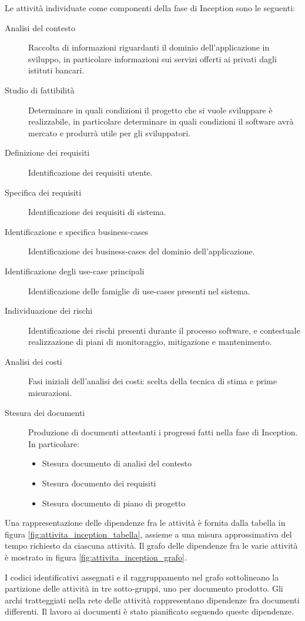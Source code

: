 Le attivit\`a individuate come componenti della fase di Inception sono le seguenti:
\begin{description}
	\item[Analisi del contesto]
		Raccolta di informazioni riguardanti il dominio dell'applicazione in sviluppo, in particolare informazioni sui servizi offerti ai privati dagli istituti bancari.
	\item[Studio di fattibilit\`a]
		Determinare in quali condizioni il progetto che si vuole sviluppare \`e realizzabile, in particolare determinare in quali condizioni il software avr\`a mercato e produrr\`a utile per gli sviluppatori.
	\item[Definizione dei requisiti]
		Identificazione dei requisiti utente.
	\item[Specifica dei requisiti]
		Identificazione dei requisiti di sistema.
	\item[Identificazione e specifica business-cases]
		Identificazione dei business-cases del dominio dell'applicazione.
	\item[Identificazione degli use-case principali]
		Identificazione delle famiglie di use-cases presenti nel sistema.
	\item[Individuazione dei rischi]
		Identificazione dei rischi presenti durante il processo software, e contestuale realizzazione di piani di monitoraggio, mitigazione e mantenimento.
	\item[Analisi dei costi]
		Fasi iniziali dell'analisi dei costi: scelta della tecnica di stima e prime misurazioni.
	\item[Stesura dei documenti]
		Produzione di documenti attestanti i progressi fatti nella fase di Inception.
		In particolare:
		\begin{itemize}
			\item Stesura documento di analisi del contesto
			\item Stesura documento dei requisiti
			\item Stesura documento di piano di progetto
		\end{itemize}
\end{description}
Una rappresentazione delle dipendenze fra le attivit\`a \`e fornita dalla tabella in figura \ref{fig:attivita_inception_tabella}, assieme a una misura approssimativa del tempo richiesto da ciascuna attivit\`a.
Il grafo delle dipendenze fra le varie attivit\`a \`e mostrato in figura \ref{fig:attivita_inception_grafo}.

I codici identificativi assegnati e il raggruppamento nel grafo sottolineano la partizione delle attivit\`a in tre sotto-gruppi, uno per documento prodotto.
Gli archi tratteggiati nella rete delle attivit\`a rappresentano dipendenze fra documenti differenti.
Il lavoro ai documenti \`e stato pianificato seguendo queste dipendenze.


